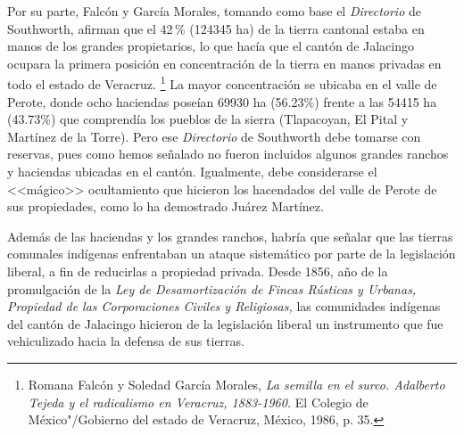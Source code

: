 \documentclass[14pt,twoside,final]{extbook} %
\let\oldfootnote\footnote
\renewcommand\footnote[1]{%
\oldfootnote{\hspace{1mm}#1}}
\begin{document}
Por su parte, Falcón y García Morales, tomando como base el \emph{Directorio} de Southworth, afirman que el 42\,\% (124345 ha) de la tierra cantonal estaba en manos de los grandes propietarios, lo que hacía que el cantón de Jalacingo ocupara la primera posición en concentración de la tierra en manos privadas en todo el estado de Veracruz.\footnote{Romana Falcón y Soledad García Morales, \emph{La semilla en el surco. Adalberto Tejeda y el radicalismo en Veracruz, 1883-1960.} El Colegio de México"/Gobierno del estado de Veracruz, México, 1986, p. 35.} La mayor concentración se ubicaba en el valle de Perote, donde ocho haciendas poseían 69930 ha (56.23\%) frente a las 54415 ha (43.73\%) que comprendía los pueblos de la sierra (Tlapacoyan, El Pital y Martínez de la Torre). Pero ese \emph{Directorio} de Southworth debe tomarse con reservas, pues como hemos señalado no
fueron incluidos algunos grandes ranchos y haciendas ubicadas en el cantón. Igualmente, debe considerarse el <<mágico>> ocultamiento que hicieron los hacendados del valle de Perote de sus propiedades, como lo ha demostrado Juárez Martínez.

Además de las haciendas y los grandes ranchos, habría que señalar que las tierras comunales indígenas enfrentaban un ataque sistemático por parte de la legislación liberal, a fin de reducirlas a propiedad privada. Desde 1856, año de la promulgación de la \emph{Ley de Desamortización de Fincas Rústicas y Urbanas, Propiedad de las Corporaciones Civiles y Religiosas,} las comunidades indígenas del cantón de Jalacingo hicieron de la legislación liberal un instrumento que fue vehiculizado hacia la defensa de sus tierras.
\end{document}
